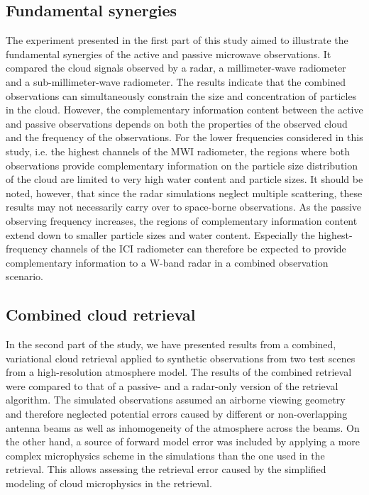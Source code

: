 \documentclass[journal abbreviation, manuscript]{copernicus}
\begin{document}
\subsection{Fundamental synergies}

The experiment presented in the first part of this study aimed to illustrate the
fundamental synergies of the active and passive microwave observations. It
compared the cloud signals observed by a radar, a millimeter-wave radiometer and
a sub-millimeter-wave radiometer. The results indicate that the combined
observations can simultaneously constrain the size and concentration of
particles in the cloud. However, the complementary information content between
the active and passive observations depends on both the properties of the
observed cloud and the frequency of the observations. For the lower frequencies
considered in this study, i.e. the highest channels of the MWI radiometer, the
regions where both observations provide complementary information on the
particle size distribution of the cloud are limited to very high water content
and particle sizes. It should be noted, however, that since the radar
simulations neglect multiple scattering, these results may not necessarily
carry over to space-borne observations. As the passive observing frequency
increases, the regions of complementary information content extend down to
smaller particle sizes and water content. Especially the highest-frequency
channels of the ICI radiometer can therefore be expected to provide
complementary information to a W-band radar in a combined observation
scenario.

\subsection{Combined cloud retrieval}

In the second part of the study, we have presented results from a combined,
variational cloud retrieval applied to synthetic observations from two test
scenes from a high-resolution atmosphere model. The results of the combined
retrieval were compared to that of a passive- and a radar-only version of the
retrieval algorithm. The simulated observations assumed an airborne viewing
geometry and therefore neglected potential errors caused by different or
non-overlapping antenna beams as well as inhomogeneity of the atmosphere across
the beams. On the other hand, a source of forward model error was included by
applying a more complex microphysics scheme in the simulations than the one used
in the retrieval. This allows assessing the retrieval error caused by the
simplified modeling of cloud microphysics in the retrieval.
\end{document}
